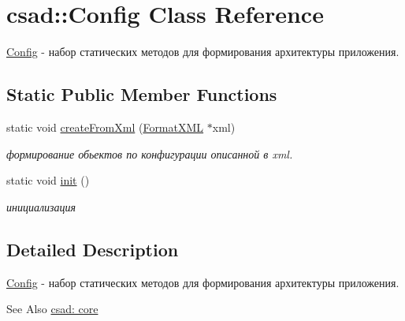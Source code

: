 \hypertarget{classcsad_1_1_config}{\section{csad\-:\-:Config Class Reference}
\label{classcsad_1_1_config}
}


\hyperlink{classcsad_1_1_config}{Config} -\/ набор статических методов для формирования архитектуры приложения.  


\subsection*{Static Public Member Functions}
\begin{DoxyCompactItemize}
\item 
\hypertarget{classcsad_1_1_config_a9ca5275eadf123eaa7be8ccfc196673e}{static void \hyperlink{classcsad_1_1_config_a9ca5275eadf123eaa7be8ccfc196673e}{create\-From\-Xml} (\hyperlink{classcsad_1_1_format_x_m_l}{Format\-X\-M\-L} $\ast$xml)}\label{classcsad_1_1_config_a9ca5275eadf123eaa7be8ccfc196673e}

\begin{DoxyCompactList}\small\item\em формирование обьектов по конфигурации описанной в xml. \end{DoxyCompactList}\item 
\hypertarget{classcsad_1_1_config_a0e567ed8f9ccb211af175b0196894700}{static void \hyperlink{classcsad_1_1_config_a0e567ed8f9ccb211af175b0196894700}{init} ()}\label{classcsad_1_1_config_a0e567ed8f9ccb211af175b0196894700}

\begin{DoxyCompactList}\small\item\em инициализация \end{DoxyCompactList}\end{DoxyCompactItemize}


\subsection{Detailed Description}
\hyperlink{classcsad_1_1_config}{Config} -\/ набор статических методов для формирования архитектуры приложения. 

\begin{DoxySeeAlso}{See Also}
\hyperlink{group__core}{csad\-: core} 
\end{DoxySeeAlso}
